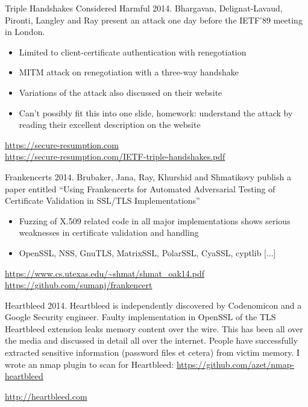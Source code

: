 \begin{frame}{Triple Handshakes Considered Harmful}
  2014. Bhargavan, Delignat-Lavaud, Pironti, Langley and Ray present an attack one day before the IETF'89 meeting in London.
  \begin{itemize}
    \item Limited to client-certificate authentication with renegotiation
    \item MITM attack on renegotiation with a three-way handshake
    \item Variations of the attack also discussed on their website
    \item Can't possibly fit this into one slide, homework: understand the attack by reading their excellent description on the website
  \end{itemize}

  
  \vspace{50px}

  \tiny
  \url{https://secure-resumption.com}\\
  \url{https://secure-resumption.com/IETF-triple-handshakes.pdf}
\end{frame}

\begin{frame}{Frankencerts}
  2014. Brubaker, Jana, Ray, Khurshid and Shmatikovy publish a paper entitled ``Using Frankencerts for Automated Adversarial Testing of Certificate Validation in SSL/TLS Implementations''
  \begin{itemize}
    \item Fuzzing of X.509 related code in all major implementations shows serious weaknesses in certificate validation and handling
    \item OpenSSL, NSS, GnuTLS, MatrixSSL, PolarSSL, CyaSSL, cyptlib [...]
  \end{itemize}

  
  \vspace{50px}

  \tiny
  \url{https://www.cs.utexas.edu/~shmat/shmat_oak14.pdf}\\
  \url{https://github.com/sumanj/frankencert}
\end{frame}

\begin{frame}{Heartbleed}
  2014. Heartbleed is independently discovered by Codenomicon and a Google Security engineer.
  \newline
  \newline
  Faulty implementation in OpenSSL of the TLS Heartbleed extension leaks memory content over the wire. This has been all over the media and discussed in detail all over the internet. People have successfully extracted sensitive information (password files et cetera) from victim memory.
  \newline
  \newline
  I wrote an nmap plugin to scan for Heartbleed: \url{https://github.com/azet/nmap-heartbleed}

  \vspace{30px}

  \tiny
  \url{http://heartbleed.com}
\end{frame}

